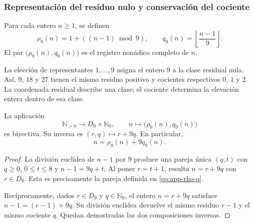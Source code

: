 \subsubsection{Representación del residuo nulo y conservación del cociente}

\begin{definicion}
\label{def:app-residuo}
Para cada entero $n\geq1$, se definen
\begin{equation}
 \rho_9(n)=1+((n-1)\bmod9),\qquad
 q_9(n)=\left\lfloor\frac{n-1}{9}\right\rfloor.
 \label{eq:app-rho-q}
\end{equation}
El par $\bigl(\rho_9(n),q_9(n)\bigr)$ es el registro nonádico completo de $n$.
\end{definicion}

La elección de representantes $1,\ldots,9$ asigna el entero $9$ a la clase residual nula. Así, $9$, $18$ y $27$ tienen el mismo residuo positivo y cocientes respectivos $0$, $1$ y $2$. La coordenada residual describe una clase; el cociente determina la elevación entera dentro de esa clase.

\begin{bloqueindivisible}
\begin{proposicion}
\label{thm:app-reconstruccion}
La aplicación
\begin{equation}
 \mathbb N_{>0}\longrightarrow D_9\times\mathbb N_0,
 \qquad n\longmapsto\bigl(\rho_9(n),q_9(n)\bigr)
\end{equation}
es biyectiva. Su inversa es $(r,q)\mapsto r+9q$. En particular,
\begin{equation}
 n=\rho_9(n)+9q_9(n).
 \label{eq:app-restitution}
\end{equation}
\end{proposicion}

\begin{proof}
La división euclídea de $n-1$ por $9$ produce una pareja única $(q,t)$ con $q\geq0$, $0\leq t\leq8$ y $n-1=9q+t$. Al poner $r=t+1$, resulta $n=r+9q$ con $r\in D_9$. Esta es precisamente la pareja definida en \eqref{eq:app-rho-q}.

Recíprocamente, dados $r\in D_9$ y $q\in\mathbb N_0$, el entero $n=r+9q$ satisface $n-1=(r-1)+9q$. Su división euclídea devuelve el mismo residuo $r-1$ y el mismo cociente $q$. Quedan demostradas las dos composiciones inversas.
\end{proof}
\end{bloqueindivisible}

